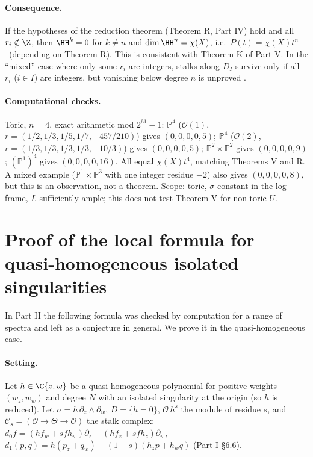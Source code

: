 \paragraph{Consequence.}If the hypotheses of the reduction theorem (Theorem R, Part IV) hold and all $r_i\notin\Z$, then $\HH^k=0$ for $k\ne n$ and $\dim\HH^n=\chi(X)$, i.e.\ $P(t)=\chi(X)t^n$ \tP\ (depending on Theorem R). This is consistent with Theorem K of Part V. In the ``mixed'' case where only some $r_i$ are integers, stalks along $D_I$ survive only if all $r_i$ ($i\in I$) are integers, but vanishing below degree $n$ is unproved \tK.

\paragraph{Computational checks\tV.}Toric, $n=4$, exact arithmetic mod $2^{61}-1$: $\mathbb P^4$ ($\mathcal O(1)$, $r=(1/2,1/3,1/5,1/7,-457/210)$) gives $(0,0,0,0,5)$; $\mathbb P^4$ ($\mathcal O(2)$, $r=(1/3,1/3,1/3,1/3,-10/3)$) gives $(0,0,0,0,5)$; $\mathbb P^2\times\mathbb P^2$ gives $(0,0,0,0,9)$; $(\mathbb P^1)^4$ gives $(0,0,0,0,16)$. All equal $\chi(X)t^4$, matching Theorems V and R. A mixed example ($\mathbb P^1\times\mathbb P^3$ with one integer residue $-2$) also gives $(0,0,0,0,8)$, but this is an observation, not a theorem. Scope: toric, $\sigma$ constant in the log frame, $L$ sufficiently ample; this does not test Theorem V for non-toric $U$.

\section{Proof of the local formula for quasi-homogeneous isolated singularities}\label{sec:local}
In Part II the following formula was checked by computation for a range of spectra and left as a conjecture in general. We prove it in the quasi-homogeneous case.

\paragraph{Setting.} Let $h\in\C\{z,w\}$ be a quasi-homogeneous polynomial for positive weights $(w_z,w_w)$ and degree $N$ with an isolated singularity at the origin (so $h$ is reduced). Let $\sigma=h\,\partial_z\wedge\partial_w$, $D=\{h=0\}$, $\mathcal O\,h^s$ the module of residue $s$, and $\mathcal C_s=(\mathcal O\to\Theta\to\mathcal O)$ the stalk complex: $d_0f=(hf_w+sfh_w)\partial_z-(hf_z+sfh_z)\partial_w$, $d_1(p,q)=h(p_z+q_w)-(1-s)(h_zp+h_wq)$ (Part I \S6.6).

